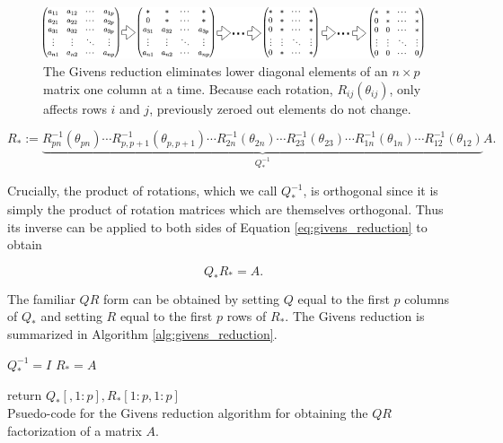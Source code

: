 \documentclass[ba]{imsart}
\numberwithin{equation}{section}
\theoremstyle{plain}
\begin{document}
\begin{figure}[h]
\centering
\vspace{.1in}
\includegraphics[width=1.0\textwidth]{figures/givens_reduction.png}
\vspace{.05in}
\caption{The Givens reduction eliminates lower diagonal elements of an $n \times p$ matrix one column at a time. Because each rotation, $R_{ij}(\theta_{ij})$, only affects rows $i$ and $j$, previously zeroed out elements do not change.}
\label{fig:givens_reduction}
\end{figure}

\begin{equation}
\label{eq:givens_reduction}
R_* := \underbrace{R_{pn}^{-1}(\theta_{pn}) \cdots R_{p,p+1}^{-1}(\theta_{p,p+1})  \cdots R_{2n}^{-1}(\theta_{2n}) \cdots R_{23}^{-1}(\theta_{23}) \cdots R_{1n}^{-1}(\theta_{1n}) \cdots R_{12}^{-1}(\theta_{12})}_{Q_*^{-1}} A.
\end{equation}

\noindent Crucially, the product of rotations, which we call $Q_*^{-1}$, is orthogonal since it is simply the product of rotation matrices which are themselves orthogonal. Thus its inverse can be applied to both sides of Equation \ref{eq:givens_reduction} to obtain

\begin{equation}
Q_* R_* = A.
\end{equation}

\noindent The familiar $QR$ form can be obtained by setting $Q$ equal to the first $p$ columns of $Q_*$ and setting $R$ equal to the first $p$ rows of $R_*$. The Givens reduction is summarized in Algorithm \ref{alg:givens_reduction}.

\begin{algorithm}[h]
\SetAlgoLined
{}
 $Q_*^{-1} = I$
  $R_* = A$
 
return $Q_*[,1:p], R_*[1:p,1:p]$
\\
\caption{Psuedo-code for the Givens reduction algorithm for obtaining the $QR$ factorization of a matrix $A$.}
 \label{alg:givens_reduction}
\end{algorithm}
\end{document}
